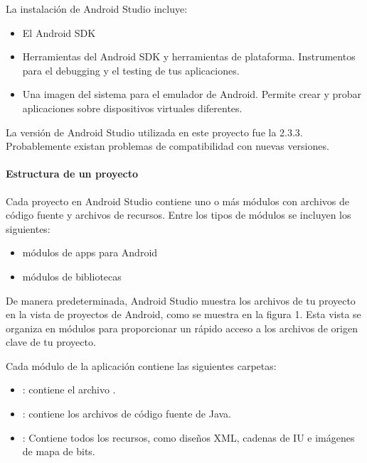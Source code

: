 La instalación de Android Studio incluye:
\begin{itemize}
\item {} 
El Android SDK

\item {} 
Herramientas del Android SDK y herramientas de plataforma. Instrumentos para el debugging y el testing de tus aplicaciones.

\item {} 
Una imagen del sistema para el emulador de Android. Permite crear y probar aplicaciones sobre dispositivos virtuales diferentes.

\end{itemize}

La versión de Android Studio utilizada en este proyecto fue la 2.3.3. Probablemente
existan problemas de compatibilidad con nuevas versiones.


\paragraph{Estructura de un proyecto}
\label{\detokenize{dev_docs:estructura-de-un-proyecto}}
Cada proyecto en Android Studio contiene uno o más módulos con archivos de código fuente y archivos de recursos. Entre los tipos de módulos se incluyen los siguientes:
\begin{itemize}
\item {} 
módulos de apps para Android

\item {} 
módulos de bibliotecas


\end{itemize}

De manera predeterminada, Android Studio muestra los archivos de tu proyecto en la vista de proyectos de Android, como se muestra en la figura 1. Esta vista se organiza en módulos para proporcionar un rápido acceso a los archivos de origen clave de tu proyecto.

Cada módulo de la aplicación contiene las siguientes carpetas:
\begin{itemize}
\item {} 
: contiene el archivo .

\item {} 
: contiene los archivos de código fuente de Java.

\item {} 
: Contiene todos los recursos, como diseños XML, cadenas de IU e imágenes de mapa de bits.

\end{itemize}

